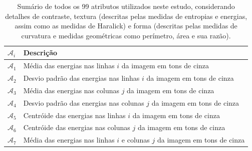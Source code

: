 \begin{table}
  \begin{center}
  \caption{\label{tab:atributos}Sumário de todos os 99 atributos utilizados
    neste estudo, considerando detalhes de contraste, textura (descritas pelas
    medidas de entropias e energias, assim como as medidas de Haralick) e forma
    (descritas pelas medidas de curvatura e medidas geométricas como perímetro,
    área e sua razão).}

  \begin{tabular}{l|l}
    \hline
    $\mathcal{A}_i$ & Descrição \\
    \hline

    $\mathcal{A}_1$ & 
    Média das energias nas linhas $i$ da imagem em tons de cinza \\

    $\mathcal{A}_2$ &
    Desvio padrão das energias nas linhas $i$ da imagem em tons de cinza \\

    $\mathcal{A}_3$ &
    Média das energias nas colunas $j$ da imagem em tons de cinza \\

    $\mathcal{A}_4$ &
    Desvio padrão das energias nas colunas $j$ da imagem em tons de cinza \\

    $\mathcal{A}_5$ &
    Centróide das energias nas linhas $i$ da imagem em tons de cinza \\

    $\mathcal{A}_6$ &
    Centróide das energias nas colunas $j$ da imagem em tons de cinza \\

    $\mathcal{A}_7$ &
    Média das energias nas linhas $i$ e colunas $j$ da imagem em tons de cinza \\


\end{tabular}
\end{center}
\end{table}
